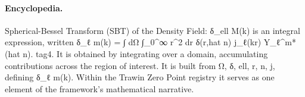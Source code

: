 \paragraph{Encyclopedia.}
Spherical-Bessel Transform (SBT) of the Density Field: δ\_ell M(k) is an integral expression, written δ\_ℓ m(k) = ∫ dΩ ∫\_0\textasciicircum{}∞ r\textasciicircum{}2 dr δ(r,hat n) j\_ℓ(kr) Y\_ℓ\textasciicircum{}m*(hat n). tag4. It is obtained by integrating over a domain, accumulating contributions across the region of interest. It is built from Ω, δ, ell, r, n, j, defining δ\_ℓ m(k). Within the Trawin Zero Point registry it serves as one element of the framework's mathematical narrative.
